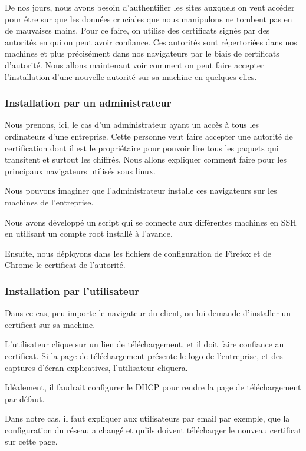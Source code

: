 De nos jours, nous avons besoin d'authentifier les sites auxquels on veut accéder pour être sur que les données cruciales que nous manipulons ne tombent pas en de mauvaises mains. Pour ce faire, on utilise des certificats signés par des autorités en qui on peut avoir confiance.
Ces autorités sont répertoriées dans nos machines et plus précisément dans nos navigateurs par le biais de certificats d'autorité.
Nous allons maintenant voir comment on peut faire accepter l'installation d'une nouvelle autorité sur sa machine en quelques clics.




\subsubsection{Installation par un administrateur}
Nous prenons, ici, le cas d'un administrateur ayant un accès à tous les ordinateurs d'une entreprise.
Cette personne veut faire accepter une autorité de certification dont il est le propriétaire pour pouvoir lire tous les paquets qui transitent et surtout les chiffrés.
Nous allons expliquer comment faire pour les principaux navigateurs utilisés sous linux.

Nous pouvons imaginer que l'administrateur installe ces navigateurs sur les machines de l'entreprise.

Nous avons développé un script qui se connecte aux différentes machines en SSH en utilisant un compte root installé à l'avance.

Ensuite, nous déployons dans les fichiers de configuration de Firefox et de Chrome le certificat de l'autorité.
\newpage



\subsubsection{Installation par l'utilisateur}
Dans ce cas, peu importe le navigateur du client, on lui demande d'installer un certificat sur sa machine.

L'utilisateur clique sur un lien de téléchargement, et il doit faire confiance au certificat.
Si la page de téléchargement présente le logo de l'entreprise, et des captures d'écran explicatives, l'utilisateur cliquera.

Idéalement, il faudrait configurer le DHCP pour rendre la page de téléchargement par défaut.

Dans notre cas, il faut expliquer aux utilisateurs par email par exemple, que la configuration du réseau a changé et qu'ils doivent télécharger le nouveau certificat sur cette page.


